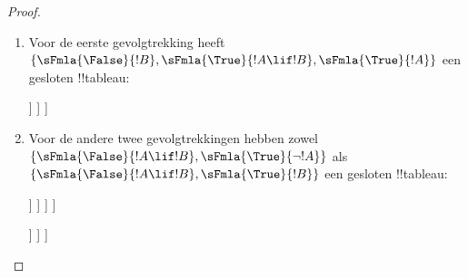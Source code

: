 \documentclass[openany]{memoir}
\begin{document}
\begin{proof}
  \begin{enumerate}
    \item Voor de eerste gevolgtrekking heeft
      $\{\sFmla{\False}{!B}, \sFmla{\True}{!A \lif !B},
      \sFmla{\True}{!A}\}$ een gesloten !!{tableau}:
      \begin{oltableau}
        [\sFmla{\False}{\formula{B}}, just=\TAss
          [\sFmla{\True}{\formula{A} \lif \formula{B}}, just=\TAss
            [\sFmla{\True}{\formula{A}}, just=\TAss
              [\sFmla{\False}{\formula{A}}, just = {\TRule{\True}{\lif}[2]}, close]
              [\sFmla{\True}{\formula{B}}, just = {\TRule{\True}{\lif}[2]}, close]
            ]
          ]
        ]
      \end{oltableau}
    \item Voor de andere twee gevolgtrekkingen hebben zowel
      $\{\sFmla{\False}{!A \lif !B},
      \sFmla{\True}{\lnot !A}\}$ als $\{\sFmla{\False}{!A \lif !B},
      \sFmla{\True}{!B}\}$ een gesloten !!{tableau}:
      \begin{oltableau}
        [\sFmla{\False}{\formula{A} \lif \formula{B}}, just = \TAss
          [\sFmla{\True}{\lnot \formula{A}}, just = \TAss
            [\sFmla{\True}{\formula{A}}, just = {\TRule{\False}{\lif}[1]}
              [\sFmla{\False}{\formula{B}}, just = {\TRule{\False}{\lif}[1]}
                [\sFmla{\False}{\formula{A}}, just = {\TRule{\True}{\lnot}[2]}, close]
              ]
            ]
          ]
        ]
      \end{oltableau}
      \begin{oltableau}
        [\sFmla{\False}{\formula{A} \lif \formula{B}}, just = \TAss
          [\sFmla{\True}{\formula{B}}, just = \TAss
            [\sFmla{\True}{\formula{A}}, just = {\TRule{\False}{\lif}[1]}
              [\sFmla{\False}{\formula{B}}, just = {\TRule{\False}{\lif}[1]},close
              ]
            ]
          ]
        ]
      \end{oltableau}
  \end{enumerate}
\end{proof}
\endgroup

\begingroup
\def\olfilename{OLP-0108}
\def\olfilepath{content/first-order-logic/tableaux/}
\hypertarget{unit-OLP-0108}{}
\end{document}
